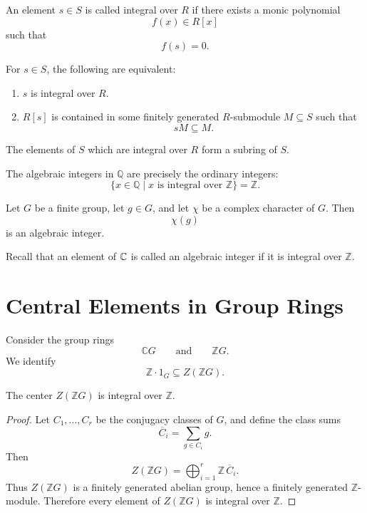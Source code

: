 \begin{definition}
An element \(s\in S\) is called integral over \(R\) if there exists a monic polynomial
\[
f(x)\in R[x]
\]
such that
\[
f(s)=0.
\]
\end{definition}

\begin{theorem}
For \(s\in S\), the following are equivalent:
\begin{enumerate}
\item \(s\) is integral over \(R\).
\item \(R[s]\) is contained in some finitely generated \(R\)-submodule \(M\subseteq S\)
such that
\[
sM\subseteq M.
\]
\end{enumerate}
\end{theorem}

\begin{theorem}
The elements of \(S\) which are integral over \(R\) form a subring of \(S\).
\end{theorem}

\begin{theorem}
The algebraic integers in \(\mathbb{Q}\) are precisely the ordinary integers:
\[
\{x\in \mathbb{Q}\mid x\text{ is integral over }\mathbb{Z}\}=\mathbb{Z}.
\]
\end{theorem}

\begin{theorem}
Let \(G\) be a finite group, let \(g\in G\), and let \(\chi\) be a complex character of \(G\).
Then
\[
\chi(g)
\]
is an algebraic integer.
\end{theorem}

\begin{remark}
Recall that an element of \(\mathbb{C}\) is called an algebraic integer if it is integral over \(\mathbb{Z}\).
\end{remark}

\section{Central Elements in Group Rings}

Consider the group rings
\[
\mathbb{C}G
\qquad\text{and}\qquad
\mathbb{Z}G.
\]
We identify
\[
\mathbb{Z}\cdot 1_G\subseteq Z(\mathbb{Z}G).
\]

\begin{proposition}
The center \(Z(\mathbb{Z}G)\) is integral over \(\mathbb{Z}\).
\end{proposition}

\begin{proof}
Let \(C_1,\dots,C_r\) be the conjugacy classes of \(G\), and define the class sums
\[
\overline C_i=\sum_{g\in C_i} g.
\]
Then
\[
Z(\mathbb{Z}G)=\bigoplus_{i=1}^r \mathbb{Z}\,\overline C_i.
\]
Thus \(Z(\mathbb{Z}G)\) is a finitely generated abelian group, hence a finitely generated
\(\mathbb{Z}\)-module. Therefore every element of \(Z(\mathbb{Z}G)\) is integral over \(\mathbb{Z}\).
\end{proof}

